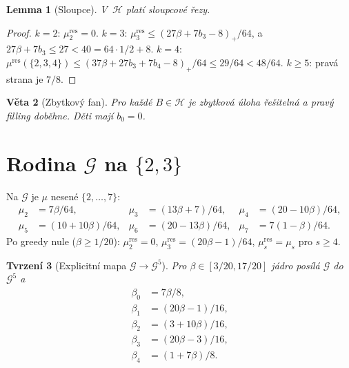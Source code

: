 \documentclass[11pt,a4paper]{article}
\newtheorem{theorem}{Věta}[section]
\newtheorem{lemma}[theorem]{Lemma}
\newtheorem{proposition}[theorem]{Tvrzení}
\theoremstyle{definition}
\theoremstyle{remark}
\newcommand{\cG}{\mathcal G}
\newcommand{\cH}{\mathcal H}
\begin{document}
\begin{lemma}[Sloupce]
\label{lem:col}
V~\(\cH\) platí sloupcové řezy.
\end{lemma}

\begin{proof}
\(k=2\): \(\mu^{\mathrm{res}}_2=0\).
\(k=3\): \(\mu^{\mathrm{res}}_3\le(27\beta+7b_3-8)_+/64\), a \(27\beta+7b_3\le 27<40=64\cdot 1/2+8\).
\(k=4\): \(\mu^{\mathrm{res}}(\{2,3,4\})\le(37\beta+27b_3+7b_4-8)_+/64\le 29/64<48/64\).
\(k\ge 5\): pravá strana je \(7/8\).
\end{proof}

\begin{theorem}[Zbytkový fan]
\label{thm:residual}
Pro každé \(B\in\cH\) je zbytková úloha řešitelná a pravý filling doběhne. Děti mají \(b_0=0\).
\end{theorem}

\section{Rodina \(\cG\) na \(\{2,3\}\)}
\label{sec:G}

Na \(\cG\) je \(\mu\) nesené \(\{2,\dots,7\}\):
\begin{align*}
\mu_2&=7\beta/64,&
\mu_3&=(13\beta+7)/64,&
\mu_4&=(20-10\beta)/64,\\
\mu_5&=(10+10\beta)/64,&
\mu_6&=(20-13\beta)/64,&
\mu_7&=7(1-\beta)/64.
\end{align*}
Po greedy nule (\(\beta\ge 1/20\)):
\(\mu^{\mathrm{res}}_2=0\), \(\mu^{\mathrm{res}}_3=(20\beta-1)/64\), \(\mu^{\mathrm{res}}_s=\mu_s\) pro \(s\ge 4\).

\begin{proposition}[Explicitní mapa \(\cG\to\cG^5\)]
\label{prop:G}
Pro \(\beta\in[3/20,17/20]\) jádro posílá \(\cG\) do \(\cG^5\) a
\begin{equation}
\label{eq:betas}
\begin{aligned}
\beta_0&=7\beta/8,\\
\beta_1&=(20\beta-1)/16,\\
\beta_2&=(3+10\beta)/16,\\
\beta_3&=(20\beta-3)/16,\\
\beta_4&=(1+7\beta)/8.
\end{aligned}
\end{equation}
\end{proposition}
\end{document}
